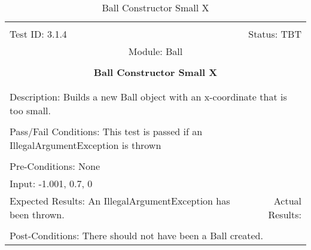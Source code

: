\documentclass[titlepage]{article}
\begin{document}
\begin{center}%
\begin{table}
\begin{tabular}{|l r|}\hline&\\[-2mm]
	Test ID: 3.1.4	&Status: TBT\\[-3mm]
	\multicolumn{2}{|c|}{Module: Ball}\\&\\
	\multicolumn{2}{|c|}{\textbf{\large{Ball Constructor Small X}}}\\&\\\hline&\\[-3mm]
	\multicolumn{2}{|p{\textwidth}|}{Description: Builds a new Ball object with an x-coordinate that is too small.}\\[1mm]\hline&\\[-3mm]
	\multicolumn{2}{|p{\textwidth}|}{Pass/Fail Conditions: This test is passed if an IllegalArgumentException is thrown}\\[1mm]\hline&\\[-3mm]
	\multicolumn{2}{|p{\textwidth}|}{Pre-Conditions: None}\\[4mm]
	\multicolumn{2}{|p{\textwidth}|}{Input: -1.001, 0.7, 0}\\[2mm]\hline
	\multicolumn{1}{|p{0.49\textwidth}}{Expected Results: An IllegalArgumentException has been thrown.}	&\multicolumn{1}{|p{0.45\textwidth}|}{Actual Results:}\\\hline&\\[-3mm]
	\multicolumn{2}{|p{\textwidth}|}{Post-Conditions: There should not have been a Ball created.}\\\hline
\end{tabular}
\caption{Ball Constructor Small X}
\end{table}
\end{center}
\end{document}
